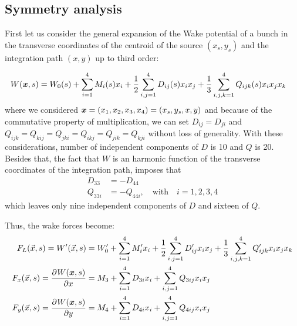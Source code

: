 \begin{apendicesenv}
\chapter{Symmetry analysis}\label{app:symmetry_analysis}

    First let us consider the general expansion of the Wake potential of a bunch in the transverse coordinates of the centroid of the source $(x_s,y_s)$ and the integration path $(x,y)$ up to third order:

    \begin{align}
		W(\boldsymbol{x},s) &= W_0(s) + \sum_{i=1}^4 M_i(s) x_i + \frac12\sum_{i,j=1}^4 D_{ij}(s) x_i x_j + \frac13\sum_{i,j,k=1}^4 Q_{ijk}(s) x_i x_j x_k
    \end{align}
    where we considered $\boldsymbol{x} = (x_1,x_2,x_3,x_4) = (x_s,y_s,x,y)$ and because of the commutative property of multiplication, we can set $D_{ij} = D_{ji}$ and $Q_{ijk}=Q_{kij}=Q_{jki}=Q_{ikj}=Q_{jik}=Q_{kji}$ without loss of generality. With these considerations, number of independent components of $D$ is 10 and $Q$ is 20. Besides that, the fact that $W$ is an harmonic function of the transverse coordinates of the integration path, imposes that
    \begin{align}
		D_{33} &= - D_{44} \\
		Q_{33i} &= - Q_{44i}, \quad \text{with} \quad i=1,2,3,4
    \end{align}
    which leaves only nine independent components of $D$ and sixteen of $Q$.

    Thus, the wake forces become:
    \begin{align}
		F_L(\vec{x},s) = W'(\vec{x},s) &= W_0' + \sum_{i=1}^4 M_i' x_i + \frac12\sum_{i,j=1}^4 D_{ij}' x_i x_j + \frac13\sum_{i,j,k=1}^4 Q_{ijk}' x_i x_j x_k \\
		F_x(\vec{x},s) = \frac{\partial^{{}}W(\boldsymbol{x},s)}{\partial x^{{}}} &= M_3 + \sum_{i=1}^4 D_{3i} x_i + \sum_{i,j=1}^4 Q_{3ij} x_i x_j \\
		F_y(\vec{x},s) = \frac{\partial^{{}}W(\boldsymbol{x},s)}{\partial y^{{}}} &= M_4 + \sum_{i=1}^4 D_{4i} x_i + \sum_{i,j=1}^4 Q_{4ij} x_i x_j
    \end{align}


\end{apendicesenv}
